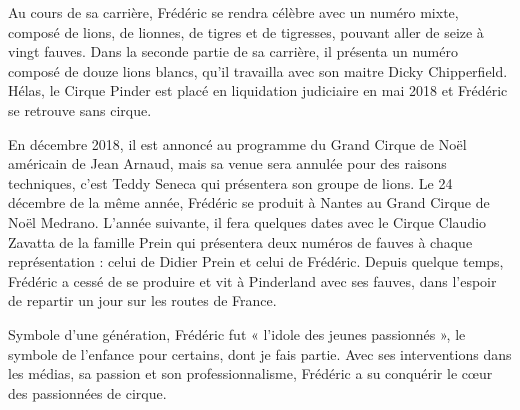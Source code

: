 Au cours de sa carrière, Frédéric se rendra célèbre avec un numéro mixte, composé de lions, de lionnes, de tigres et de tigresses, pouvant aller de seize à vingt fauves. Dans la seconde partie de sa carrière, il présenta un numéro composé de douze lions blancs, qu'il travailla avec son maitre Dicky Chipperfield. Hélas, le Cirque Pinder est placé en liquidation judiciaire en mai 2018 et Frédéric se retrouve sans cirque.

En décembre 2018, il est annoncé au programme du Grand Cirque de Noël américain de Jean Arnaud, mais sa venue sera annulée pour des raisons techniques, c’est Teddy Seneca qui présentera son groupe de lions. Le 24 décembre de la même année, Frédéric se produit à Nantes au Grand Cirque de Noël Medrano. L’année suivante, il fera quelques dates avec le Cirque Claudio Zavatta de la famille Prein qui présentera deux numéros de fauves à chaque représentation : celui de Didier Prein et celui de Frédéric. Depuis quelque temps, Frédéric a cessé de se produire et vit à Pinderland avec ses fauves, dans l’espoir de repartir un jour sur les routes de France.

Symbole d’une génération, Frédéric fut « l’idole des jeunes passionnés », le symbole de l’enfance pour certains, dont je fais partie. Avec ses interventions dans les médias, sa passion et son professionnalisme, Frédéric a su conquérir le cœur des passionnées de cirque.


